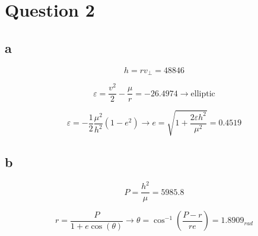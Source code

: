 \section{Question 2}
\subsection{a}
$$
h = rv_{\perp} = 48846
$$

$$
\varepsilon = \dfrac{v^2}{2} - \dfrac{\mu}{r} = -26.4974 \to \text{elliptic}
$$

$$
\varepsilon = -\dfrac{1}{2}\dfrac{\mu^2}{h^2}(1-e^2) \to e = \sqrt{1 + \dfrac{2 \varepsilon h^2}{\mu^2}} =  0.4519 
$$

\subsection{b}
$$
P = \dfrac{h^2}{\mu} = 5985.8
$$

$$
r = \dfrac{P}{1+e\cos(\theta)} \to \theta = \cos^{-1} \left(\dfrac{P-r}{re}\right) = 1.8909_{rad}
$$